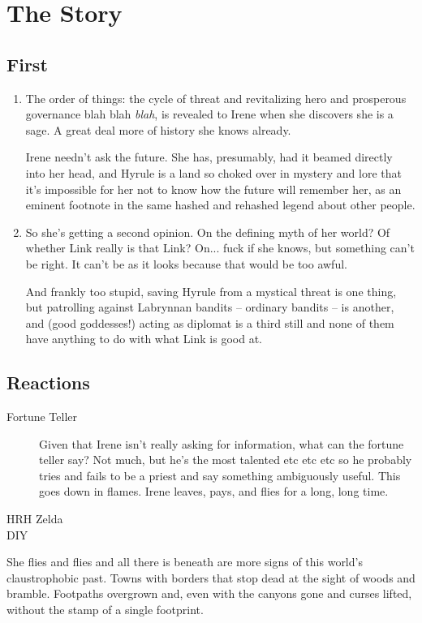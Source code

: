 \documentclass{article}
\begin{document}
\section{The Story}
\subsection{First}
\begin{enumerate}
\item The order of things: the cycle of threat and revitalizing hero and prosperous governance blah blah \emph{blah}, is revealed to Irene when she discovers she is a sage. A great deal more of history she knows already. 

Irene needn't ask the future. She has, presumably, had it beamed directly into her head, and Hyrule is a land so choked over in mystery and lore that it's impossible for her not to know how the future will remember her, as an eminent footnote in the same hashed and rehashed legend about other people. 
\item So she's getting a second opinion. On the defining myth of her world? Of whether Link really is that Link? On... fuck if she knows, but something can't be right. It can't be as it looks because that would be too awful. 

And frankly too stupid, saving Hyrule from a mystical threat is one thing, but patrolling against Labrynnan bandits -- ordinary bandits -- is another, and (good goddesses!) acting as diplomat is a third still and none of them have anything to do with what Link is good at. 
\end{enumerate}
\subsection{Reactions}

\begin{description}
\item[Fortune Teller] Given that Irene isn't really asking for information, what can the fortune teller say?  Not much, but he's the most talented etc etc etc so he probably tries and fails to be a priest and say something ambiguously useful. This goes down in flames. Irene leaves, pays, and flies for a long, long time.

\item[HRH Zelda]
\item[DIY]
\end{description}

 She flies and flies and all there is beneath are more signs of this world's claustrophobic past. Towns with borders that stop dead at the sight of woods and bramble. Footpaths overgrown and, even with the canyons gone and curses lifted, without the stamp of a single footprint.
\end{document}
